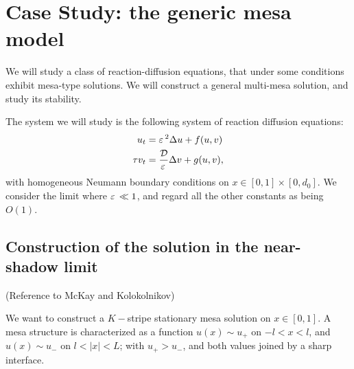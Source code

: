 \section{Case Study: the generic mesa model}

We will study a class of reaction-diffusion equations, that under some conditions exhibit mesa-type solutions. We will construct a general multi-mesa solution, and study its stability.

The system we will study is the following system of reaction diffusion equations:
% 
\begin{equation}
\label{eqn:gms1}
\begin{split}
\begin{aligned}
	u_t &= \varepsilon\,^2\Delta u + f(u,v) \\
	\tau v_t &= \frac{\mathcal{D}}{\varepsilon\,}\Delta v + g(u,v),
\end{aligned}
\end{split}
\end{equation}
% 
with homogeneous Neumann boundary conditions on $x\in[0,1]\times[0,d_0]$. We consider the limit where $\varepsilon\,\ll 1$, and regard all the other constants as being $O(1)$. 

\subsection{Construction of the solution in the near-shadow limit}

(Reference to McKay and Kolokolnikov)

We want to construct a $K-$stripe stationary mesa solution on $x\in[0,1]$. A mesa structure is characterized as a function $u(x)\sim u_+$ on $-l<x<l$, and $u(x)\sim u_-$ on $l<|x|<L$; with $u_+>u_-$, and both values joined by a sharp interface.

